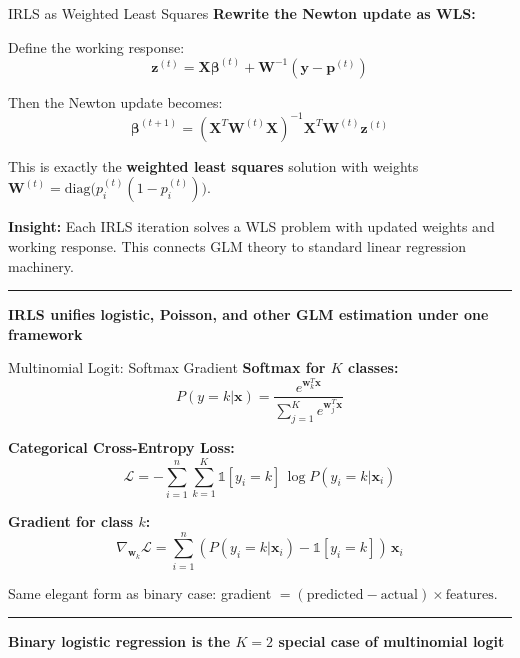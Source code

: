 \documentclass[8pt,aspectratio=169]{beamer}
\newcommand{\bottomnote}[1]{%
\vfill
\vspace{-2mm}
\textcolor{mllavender2}{\rule{\textwidth}{0.4pt}}
\vspace{1mm}
\footnotesize
\textbf{#1}
}
\begin{document}
\begin{frame}[t]{IRLS as Weighted Least Squares}
\textbf{Rewrite the Newton update as WLS:}

Define the working response:
\begin{equation}
  \mathbf{z}^{(t)} = \mathbf{X}\boldsymbol{\beta}^{(t)} + \mathbf{W}^{-1}(\mathbf{y} - \mathbf{p}^{(t)})
\end{equation}

Then the Newton update becomes:
\begin{equation}
  \boldsymbol{\beta}^{(t+1)} = (\mathbf{X}^T\mathbf{W}^{(t)}\mathbf{X})^{-1}\mathbf{X}^T\mathbf{W}^{(t)}\mathbf{z}^{(t)}
\end{equation}

This is exactly the \textbf{weighted least squares} solution with weights $\mathbf{W}^{(t)} = \text{diag}\bigl(p_i^{(t)}(1 - p_i^{(t)})\bigr)$.

\vspace{0.3em}
\textbf{Insight:} Each IRLS iteration solves a WLS problem with updated weights and working response. This connects GLM theory to standard linear regression machinery.
\bottomnote{IRLS unifies logistic, Poisson, and other GLM estimation under one framework}
\end{frame}

\begin{frame}[t]{Multinomial Logit: Softmax Gradient}
\textbf{Softmax for $K$ classes:}
\begin{equation}
  P(y=k|\mathbf{x}) = \frac{e^{\mathbf{w}_k^T\mathbf{x}}}{\sum_{j=1}^{K} e^{\mathbf{w}_j^T\mathbf{x}}}
\end{equation}

\textbf{Categorical Cross-Entropy Loss:}
\begin{equation}
  \mathcal{L} = -\sum_{i=1}^{n}\sum_{k=1}^{K} \mathbb{1}[y_i = k]\,\log P(y_i = k|\mathbf{x}_i)
\end{equation}

\textbf{Gradient for class $k$:}
\begin{equation}
  \nabla_{\mathbf{w}_k}\mathcal{L} = \sum_{i=1}^{n}(P(y_i = k|\mathbf{x}_i) - \mathbb{1}[y_i = k])\,\mathbf{x}_i
\end{equation}

Same elegant form as binary case: gradient $= (\text{predicted} - \text{actual}) \times \text{features}$.
\bottomnote{Binary logistic regression is the $K=2$ special case of multinomial logit}
\end{frame}
\end{document}
